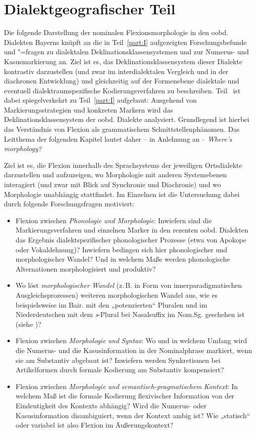 \part{Dialektgeografischer Teil}
\label{part:II}
\noindent Die folgende Darstellung der nominalen Flexionsmorphologie in den oobd. Dialekten Bayerns knüpft an die in Teil~\ref{part:I} aufgezeigten Forschungsbefunde und "=fra\-gen zu dialektalen Deklinationsklassensystemen und zur Numerus- und Kasusmarkierung an. Ziel ist es, das Deklinationsklassensystem dieser Dialekte kontrastiv darzustellen (und zwar im interdialektalen Vergleich und in der diachronen Entwicklung) und gleichzeitig auf der Formenebene dialektale und eventuell dialektraumspezifische Kodierungsverfahren zu beschreiben. Teil~\ref{part:II} ist dabei spiegelverkehrt zu Teil~\ref{part:I} aufgebaut: Ausgehend von Markierungsstrategien und konkreten Markern wird das Deklinationsklassensystem der oobd. Dialekte analysiert. Grundlegend ist hierbei das Verständnis von Flexion als grammatischem Schnittstellenphänomen. Das Leitthema der folgenden Kapitel lautet daher -- in Anlehnung an \citet[13]{Harnisch1987} -- \textit{Where’s} \textit{morphology?}


Ziel ist es, die Flexion innerhalb des Sprachsystems der jeweiligen Ortsdialekte darzustellen und aufzuzeigen, wo Morphologie mit anderen Systemebenen interagiert (und zwar mit Blick auf Synchronie und Diachronie) und wo Morphologie unabhängig stattfindet. Im Einzelnen ist die Untersuchung dabei durch folgende Forschungsfragen motiviert:

\begin{itemize}
\item Flexion zwischen \textit{Phonologie} \textit{und} \textit{Morphologie}: Inwiefern sind die Markierungsverfahren und einzelnen Marker in den rezenten oobd. Dialekten das Ergebnis dialektspezifischer phonologischer Prozesse (etwa von Apokope oder Vokaldehnung)? Inwiefern bedingen sich hier phonologischer und morphologischer Wandel? Und in welchem Maße werden phonologische Alternationen morphologisiert und produktiv?
\item Wo löst \textit{morphologischer} \textit{Wandel} (z.\,B. in Form von innerparadigmatischen Ausgleichsprozessen) weiteren morphologischen Wandel aus, wie es beispielsweise im Bair. mit den „potenzierten“ Pluralen und im Niederdeutschen mit dem \textit{s}{}-Plural bei Nasalsuffix im Nom.Sg. geschehen ist (siehe )?
\item Flexion zwischen \textit{Morphologie} \textit{und} \textit{Syntax}: Wo und in welchem Umfang wird die Numerus- und die Kasusinformation in der Nominalphrase markiert, wenn sie am Substantiv abgebaut ist? Inwiefern werden Synkretismen bei Artikelformen durch formale Kodierung am Substantiv kompensiert?
\item Flexion zwischen \textit{Morphologie} \textit{und} \textit{semantisch-pragmatischem} \textit{Kontext}: In welchem Maß ist die formale Kodierung flexivischer Information von der Eindeutigkeit des Kontexts abhängig? Wird die Numerus- oder Kasusinformation disambiguiert, wenn der Kontext ambig ist? Wie „statisch“ oder variabel ist also Flexion im Äußerungskontext?
\end{itemize}


